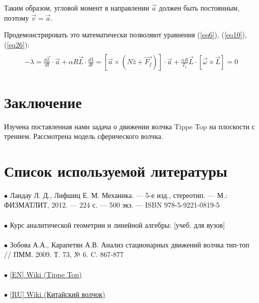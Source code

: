 \documentclass[a4paper,11.5pt]{article} %
\begin{document}
Таким образом, угловой момент в направлении $\vec{a}$ должен быть постоянным, поэтому $\vec{v} = \vec{a}$.

Продемонстрировать это математически позволяют уравнения (\ref{eq6}), (\ref{eq10}), (\ref{eq26}):
\begin{multline}
\\
-\dot{\lambda} = \frac{d\vec{L}}{dt}\cdot \vec{a} + \alpha R\vec{L}\cdot \frac{d\hat{3}}{dt} = \left[\vec{a}\times (N\hat{z} + \overrightarrow{F_f})\right]\cdot \vec{a} + \frac{\alpha R}{I_1}\vec{L}\cdot \left[\overrightarrow{\omega} \times \vec{L}\right] = 0
	\label{eq30}
\end{multline}

\section{Заключение}

Изучена поставленная нами задача о движении волчка Tippe Top на плоскости с
трением. Рассмотрена модель сферического волчка.


\section{Список используемой литературы}

$\bullet$ Ландау Л. Д., Лифшиц Е. М. Механика. — 5-е изд., стереотип. — М.: ФИЗМАТЛИТ, 2012. — 224 с. — 500 экз. — ISBN 978-5-9221-0819-5\\
\\
$\bullet$ Курс аналитической геометрии и линейной алгебры: [учеб. для вузов]\\
\\
$\bullet$ Зобова А.А., Карапетян А.В. Анализ стационарных движений волчка тип-топ // ПММ. 2009. Т. 73,
№ 6. C. 867-877\\
\\ 
$\bullet$ \href{https://en.wikipedia.org/wiki/Tippe_top}{[EN] Wiki (Tippe Top)}\\
\\
$\bullet$ \href{https://ru.wikipedia.org/wiki/\%D0\%9A\%D0\%B8\%D1\%82\%D0\%B0\%D0\%B9\%D1\%81\%D0\%BA\%D0\%B8\%D0\%B9_\%D0\%B2\%D0\%BE\%D0\%BB\%D1\%87\%D0\%BE\%D0\%BA}{[RU] Wiki (Китайский волчок)}

					
\end{document}
